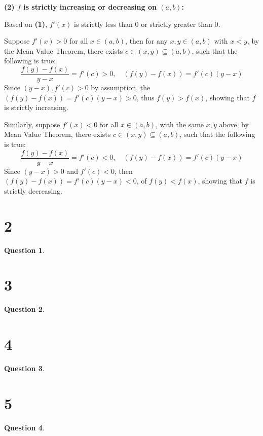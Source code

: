 \documentclass{article}
\newtheorem{question}{Question}
\begin{document}
\textbf{(2) $f$ is strictly increasing or decreasing on $(a,b)$:}

Based on \textbf{(1)}, $f'(x)$ is strictly less than $0$ or strictly greater than $0$.

Suppose $f'(x)>0$ for all $x\in(a,b)$, then for any $x,y\in (a,b)$ with $x<y$, by the Mean Value Theorem, 
there exists $c\in (x,y)\subseteq (a,b)$, such that the following is true:
$$\frac{f(y)-f(x)}{y-x}=f'(c) >0,\quad (f(y)-f(x))=f'(c)(y-x)$$
Since $(y-x), f'(c)>0$ by assumption, the $(f(y)-f(x))=f'(c)(y-x)>0$, thus $f(y)>f(x)$, showing that $f$ is strictly increasing.

Similarly, suppose $f'(x)<0$ for all $x\in (a,b)$, with the same $x,y$ above, by Mean Value Theorem, there exists $c\in(x,y)\subseteq (a,b)$,
such that the following is true:
$$\frac{f(y)-f(x)}{y-x}=f'(c) <0,\quad (f(y)-f(x))=f'(c)(y-x)$$
Since $(y-x)>0$ and $f'(c)<0$, then $(f(y)-f(x))=f'(c)(y-x)<0$, of $f(y)<f(x)$, showing that $f$ is strictly decreasing.

\break

\section*{2}
\begin{question}
    
\end{question}

\break

\section*{3}
\begin{question}
    
\end{question}

\break

\section*{4}
\begin{question}
    
\end{question}

\break

\section*{5}
\begin{question}
    
\end{question}
\end{document}
